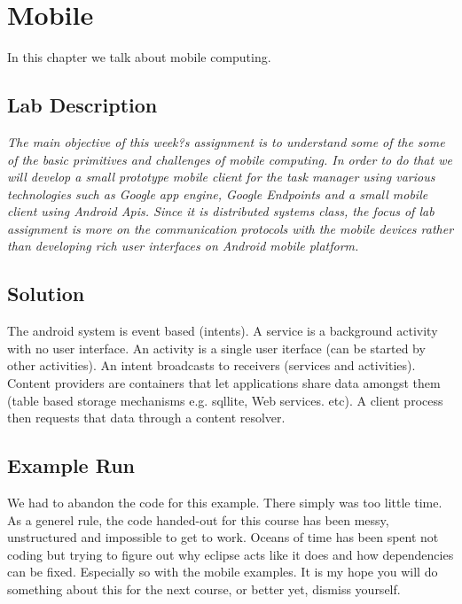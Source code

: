 \chapter{Mobile}
\minitoc

In this chapter we talk about mobile computing. 

\section{Lab Description}

\textit{The main objective of this week?s assignment is to understand some of the some of the basic primitives and challenges of mobile computing. In order to do that we will develop a small prototype mobile client for the task manager using various technologies such as Google app engine, Google Endpoints and a small mobile client using  Android Apis. Since it is distributed systems class, the focus of lab assignment is more on the communication protocols with the mobile devices rather than developing rich user interfaces on Android mobile platform.}

\section{Solution}

The android system is event based (intents). A service is a background activity with no user interface. An activity is a single user iterface (can be started by other activities). An intent broadcasts to receivers (services and activities). Content providers are containers that let applications share data amongst them (table based storage mechanisms e.g. sqllite, Web services. etc). A client process then requests that data through a content resolver. 


\section{Example Run}

We had to abandon the code for this example. There simply was too little time. \\
As a generel rule, the code handed-out for this course has been messy, unstructured and impossible to get to work.
Oceans of time has been spent not coding but trying to figure out why eclipse acts like it does and how dependencies can be fixed.
Especially so with the mobile examples. It is my hope you will do something about this for the next course, or better yet, dismiss yourself.


